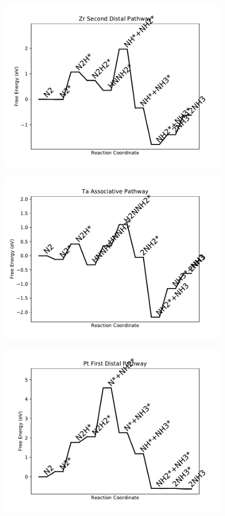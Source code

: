\begin{figure}
\includegraphics[width=0.8\linewidth]{data/plots/Zr_distal_2.pdf}
\end{figure}

\begin{figure}
\includegraphics[width=0.8\linewidth]{data/plots/Ta_associative.pdf}
\end{figure}

\begin{figure}
\includegraphics[width=0.8\linewidth]{data/plots/Pt_distal_1.pdf}
\end{figure}

